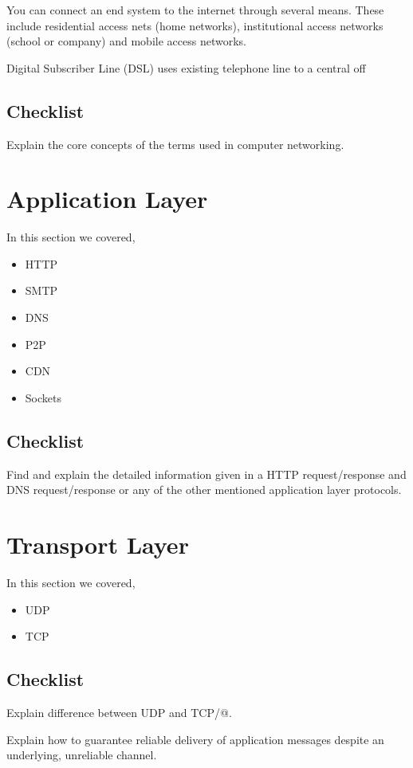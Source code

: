 \documentclass[a4paper, twoside]{book}
\begin{document}
You can connect an end system to the internet through several means. These
include residential access nets (home networks), institutional access networks
(school or company) and mobile access networks.

Digital Subscriber Line (DSL) uses existing telephone line to a central
off

\section{Checklist}
Explain the core concepts of the terms used in computer networking.

\chapter{Application Layer}
In this section we covered,
\begin{itemize}
    \item HTTP
    \item SMTP
    \item DNS
    \item P2P
    \item CDN
    \item Sockets
\end{itemize}

\section{Checklist}
Find and explain the detailed information given in a HTTP request/response
and DNS request/response or any of the other mentioned application layer
protocols.

\chapter{Transport Layer}
In this section we covered,
\begin{itemize}
    \item UDP
    \item TCP
\end{itemize}

\section{Checklist}
Explain difference between UDP and TCP/@.

Explain how to guarantee reliable delivery of application messages despite
an underlying, unreliable channel.
\end{document}
